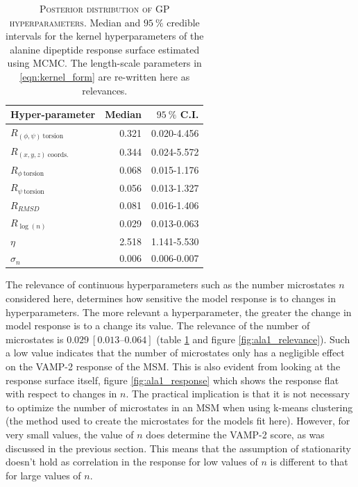 \begin{table}
    \centering
    \caption[Posterior distribution of GP hyperparameters]{\textsc{Posterior distribution of GP hyperparameters}. Median and $\SI{95}{\percent}$ credible intervals for the kernel hyperparameters of the alanine dipeptide response surface estimated using MCMC. The length-scale parameters in \ref{eqn:kernel_form} are re-written here as relevances.}
    \begin{tabular}{lrr}
    \toprule
                          Hyper-parameter &    Median & $\SI{95}{\percent}$ C.I. \\
    \midrule
     $R_{(\phi, \psi)\ \mathrm{torsion}}$ &  0.321 & 0.020-4.456 \\
        $R_{(x, y, z)\ \mathrm{coords.}}$ &  0.344 & 0.024-5.572 \\
             $R_{\phi\ \mathrm{torsion}}$ &  0.068 & 0.015-1.176 \\
             $R_{\psi\ \mathrm{torsion}}$ &  0.056 & 0.013-1.327 \\
                               $R_{RMSD}$ &  0.081 & 0.016-1.406 \\
                          $R_{\log{(n)}}$ &  0.029 & 0.013-0.063 \\
                                   $\eta$ &  2.518 & 1.141-5.530 \\
                               $\sigma_n$ &  0.006 & 0.006-0.007 \\
    \bottomrule
    \end{tabular}
    \label{tab:ala1_rel_post}
\end{table}


The relevance of continuous hyperparameters such as the number microstates $n$ considered here,  determines how sensitive the model response is to changes in hyperparameters. The more relevant a hyperparameter, the  greater the change in model response is to a change its value.  The  relevance of the number of microstates is $0.029\ [\numrange[range-phrase=\text{--}]{0.013}{0.064}]$ (table \ref{tab:ala1_rel_post} and figure \ref{fig:ala1_relevance}). Such a low value indicates that the number of microstates only has a negligible effect on the VAMP-2 response of the MSM. This is also evident from looking at the response surface itself, figure  \ref{fig:ala1_response} which shows the response flat with respect to changes in $n$. The practical implication is that it is not necessary to optimize the number of microstates in an MSM when using k-means clustering (the method used to create the microstates for the models fit here). However, for very small values, the value of $n$ does determine the VAMP-2 score, as was discussed in the previous section. This means that the assumption of stationarity doesn't hold as correlation in the response for low values of $n$ is different to that for large values of $n$. 

